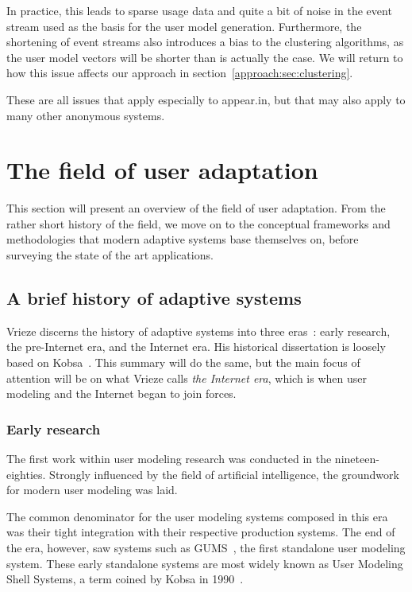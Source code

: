 In practice, this leads to sparse usage data and quite a bit of noise in the event stream used as the basis for the user model generation. Furthermore, the shortening of event streams also introduces a bias to the clustering algorithms, as the user model vectors will be shorter than is actually the case. We will return to how this issue affects our approach in section~\ref{approach:sec:clustering}.

These are all issues that apply especially to appear.in, but that may also apply to many other anonymous systems.

\section{The field of user adaptation}
\label{survey:sec:user_adaptation}

This section will present an overview of the field of user adaptation. From the rather short history of the field, we move on to the conceptual frameworks and methodologies that modern adaptive systems base themselves on, before surveying the state of the art applications.

\subsection{A brief history of adaptive systems}
\label{survey:sec:adaptive_systems_history}

Vrieze discerns the history of adaptive systems into three eras~\cite{Vrieze}: early research, the pre-Internet era, and the Internet era. His historical dissertation is loosely based on Kobsa~\cite{Kobsa2001}. This summary will do the same, but the main focus of attention will be on what Vrieze calls \emph{the Internet era}, which is when user modeling and the Internet began to join forces.

\subsubsection{Early research}

The first work within user modeling research was conducted in the nineteen-eighties. Strongly influenced by the field of artificial intelligence, the groundwork for modern user modeling was laid.

The common denominator for the user modeling systems composed in this era was their tight integration with their respective production systems. The end of the era, however, saw systems such as GUMS~\cite{Finin1989}, the first standalone user modeling system. These early standalone systems are most widely known as User Modeling Shell Systems, a term coined by Kobsa in 1990~\cite{Kobsa1990}.

